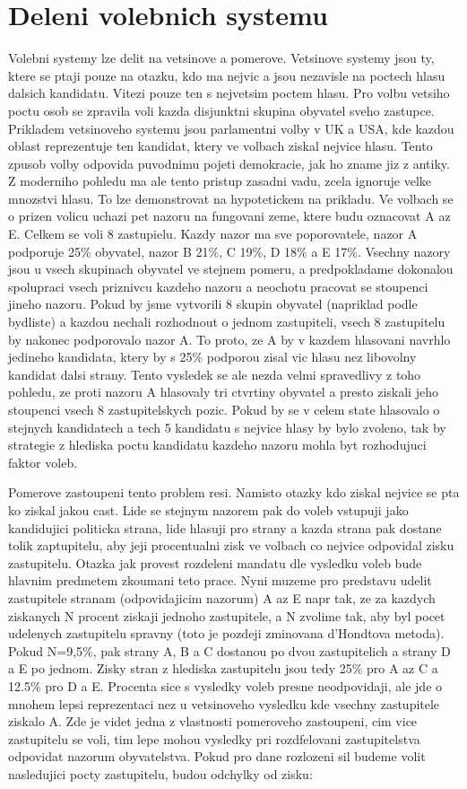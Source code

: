 \documentclass[12pt,a4paper]{article}
\begin{document}
\section{Deleni volebnich systemu}
Volebni systemy lze delit na vetsinove a pomerove. Vetsinove systemy jsou ty, ktere se ptaji pouze na otazku, kdo ma nejvic a jsou nezavisle na poctech hlasu dalsich kandidatu.
Vitezi pouze ten s nejvetsim poctem hlasu. Pro volbu vetsiho poctu osob se zpravila voli kazda disjunktni skupina obyvatel sveho zastupce. Prikladem vetsinoveho systemu jsou parlamentni volby v UK a USA, kde kazdou oblast reprezentuje ten kandidat, ktery ve volbach ziskal nejvice hlasu. Tento zpusob volby odpovida puvodnimu pojeti demokracie, jak ho zname jiz z antiky. 
Z moderniho pohledu ma ale tento pristup zasadni vadu, zcela ignoruje velke mnozstvi hlasu.
To lze demonstrovat na hypotetickem na prikladu. Ve volbach se o prizen volicu uchazi pet nazoru na fungovani zeme, ktere budu oznacovat A az E.
Celkem se voli 8 zastupielu.
Kazdy nazor ma sve poporovatele, nazor A podporuje 25\% obyvatel, nazor B 21\%, C 19\%, D 18\% a E 17\%.
Vsechny nazory jsou u vsech skupinach obyvatel ve stejnem pomeru, a predpokladame dokonalou spolupraci vsech priznivcu kazdeho nazoru a neochotu pracovat se stoupenci jineho nazoru.
Pokud by jsme vytvorili 8 skupin obyvatel (napriklad podle bydliste) a kazdou nechali rozhodnout o jednom zastupiteli, vsech 8 zastupitelu by nakonec podporovalo nazor A.
To proto, ze A by v kazdem hlasovani navrhlo jedineho kandidata, ktery by s 25\% podporou zisal vic hlasu nez libovolny kandidat dalsi strany. 
Tento vysledek se ale nezda velmi spravedlivy z toho pohledu, ze proti nazoru A hlasovaly tri ctvrtiny obyvatel a presto ziskali jeho stoupenci vsech 8 zastupitelskych pozic.
Pokud by se v celem state hlasovalo o stejnych kandidatech a tech 5 kandidatu s nejvice hlasy by bylo zvoleno, tak by strategie z hlediska poctu kandidatu kazdeho nazoru mohla byt rozhodujuci faktor voleb. 

Pomerove zastoupeni tento problem resi.
Namisto otazky kdo ziskal nejvice se pta ko ziskal jakou cast. Lide se stejnym nazorem pak do voleb vstupuji jako kandidujici politicka strana, lide hlasuji pro strany a kazda strana pak dostane tolik zaptupitelu, aby jeji procentualni zisk ve volbach co nejvice odpovidal zisku zastupitelu.
Otazka jak provest rozdeleni mandatu dle vysledku voleb bude hlavnim predmetem zkoumani teto prace.
Nyni muzeme pro predstavu udelit zastupitele stranam (odpovidajicim nazorum) A az E napr tak, ze za kazdych ziskanych N procent ziskaji jednoho zastupitele, a N zvolime tak, aby byl pocet udelenych zastupitelu spravny (toto je pozdeji zminovana d'Hondtova metoda).
Pokud N=9,5\%, pak strany A, B a C dostanou po dvou zastupitelich a strany D a E po jednom.
Zisky stran z hlediska zastupitelu jsou tedy 25\% pro A az C a 12.5\% pro D a E.
Procenta sice s vysledky voleb presne neodpovidaji, ale jde o mnohem lepsi reprezentaci nez u vetsinoveho vysledku kde vsechny zastupitele ziskalo A.
Zde je videt jedna z vlastnosti pomeroveho zastoupeni, cim vice zastupitelu se voli, tim lepe mohou vysledky pri rozdfelovani zastupitelstva odpovidat nazorum obyvatelstva.
Pokud pro dane rozlozeni sil budeme volit nasledujici pocty zastupitelu, budou odchylky od  zisku:
\end{document}
